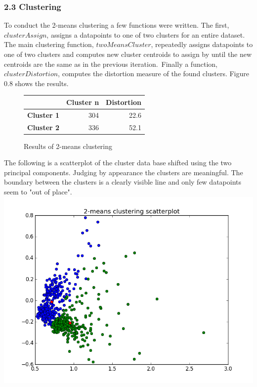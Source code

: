 \documentclass[a4paper,danish,8pt,oneside,openany]{memoir}
\begin{document}
\subsubsection*{2.3 Clustering}
To conduct the 2-means clustering a few functions were written. The first, $clusterAssign$, assigns a datapoints to one of two clusters for an entire dataset.\\
The main clustering function, $twoMeansCluster$, repeatedly assigns datapoints to one of two clusters and computes new cluster centroids to assign by until the new centroids are the same as in the previous iteration.\
Finally a function, $clusterDistortion$, computes the distortion measure of the found clusters. Figure 0.8 shows the results.
\\
\begin{figure}[!h]
\centering
\begin{tabular}{|r|r|r|}
\hline
& \textbf{Cluster n} & \textbf{Distortion} \\ \hline
\textbf{Cluster 1} & 304 & 22.6\\ \hline
\textbf{Cluster 2} & 336 & 52.1\\ \hline
\end{tabular}
\caption{Results of 2-means clustering}
\end{figure}
\newpage
The following is a scatterplot of the cluster data base shifted using the two principal components. Judging by appearance the clusters are meaningful. The boundary between the clusters is a clearly visible line and only few datapoints seem to "out of place".
\\
\includegraphics[scale=0.64]{2meansCluster}
\end{document}
